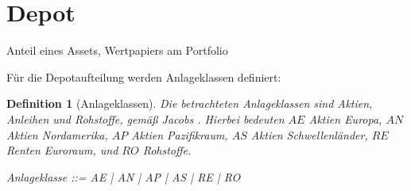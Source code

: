 \documentclass[12pt]{scrartcl}
\newtheorem{genericdef}{Generic Definition}[section]
\newtheorem{zdef}{Definition}[section]
\newcommand{\dsum}{\Sigma}
\begin{document}
\section{Depot}
\label{sec:depot}
Anteil eines Assets, Wertpapiers am Portfolio


Für die Depotaufteilung werden Anlageklassen definiert:

\begin{zdef}[Anlageklassen]
  \label{zdef:anlageklassen}
  Die betrachteten Anlageklassen sind Aktien, Anleihen und Rohstoffe,
  gemäß Jacobs \cite{Jacobs2016}. Hierbei bedeuten $AE$ Aktien Europa,
  $AN$ Aktien Nordamerika, $AP$ Aktien Pazifikraum, $AS$ Aktien
  Schwellenländer, $RE$ Renten Euroraum, und $RO$ Rohstoffe. 
  \begin{zed}
    Anlageklasse ::= AE | AN | AP | AS | RE | RO 
  \end{zed}
\end{zdef}





\end{document}
